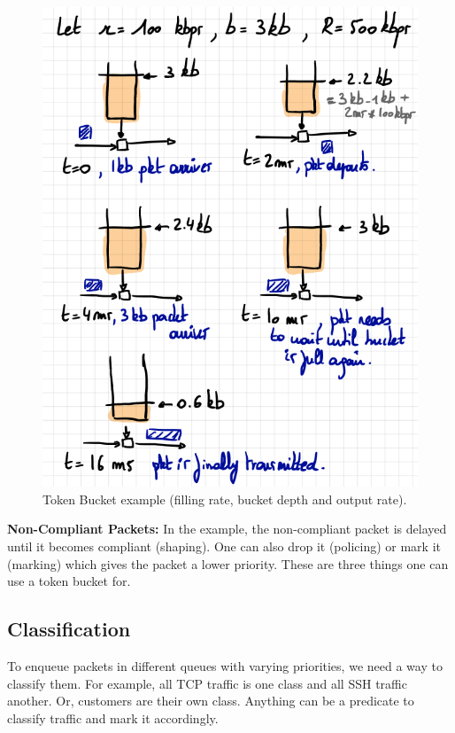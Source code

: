 \begin{figure}[h]
	\centering
	\includegraphics[scale=0.5]{images/2-bucketexample.PNG}
	\caption{Token Bucket example (filling rate, bucket depth and output rate).}
	\label{fig:bucket}
\end{figure}

\textbf{Non-Compliant Packets:} In the example, the non-compliant packet is delayed until it becomes compliant (shaping). One can also drop it (policing) or mark it (marking) which  gives the packet a lower priority. These are three things one can use a token bucket for.



\subsection{Classification}

To enqueue packets in different queues with varying priorities, we need a way to classify them. For example, all TCP traffic is one class and all SSH traffic another. Or, customers are their own class. Anything can be a predicate to classify traffic and mark it accordingly.